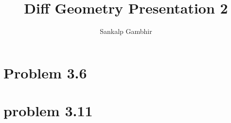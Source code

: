 \documentclass[aspectratio=169]{beamer}
\title{Diff Geometry Presentation 2}
\author{
    Sankalp Gambhir
}
\begin{document}
    \frame{\titlepage}

    \section{Problem 3.6}
    

    \section{problem 3.11}
    
\end{document}
